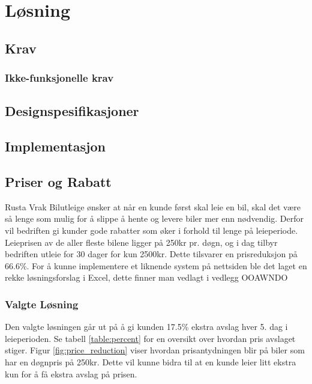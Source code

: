 \chapter{Løsning}

\section{Krav}
\subsection{Ikke-funksjonelle krav}

\section{Designspesifikasjoner}



\section{Implementasjon}






\newpage
\section{Priser og Rabatt}
Rusta Vrak Bilutleige ønsker at når en kunde først skal leie en bil, skal det være så lenge som mulig for å slippe å hente og levere biler mer enn nødvendig. Derfor vil bedriften gi kunder gode rabatter som øker i forhold til lenge på leieperiode. Leieprisen av de aller fleste bilene ligger på 250kr pr. døgn, og i dag tilbyr bedriften utleie for 30 dager for kun 2500kr. Dette tilsvarer en prisreduksjon på 66.6\%. For å kunne implementere et liknende system på nettsiden ble det laget en rekke løsningsforslag i Excel, dette finner man vedlagt i vedlegg OOAWNDO

\subsection*{Valgte Løsning}
Den valgte løsningen går ut på å gi kunden 17.5\% ekstra avslag hver 5. dag i leieperioden. Se tabell \ref{table:percent} for en oversikt over hvordan pris avslaget stiger. Figur \ref{fig:price_reduction} viser hvordan prisantydningen blir på biler som har en døgnpris på 250kr. Dette vil kunne bidra til at en kunde leier litt ekstra kun for å få ekstra avslag på prisen. 

